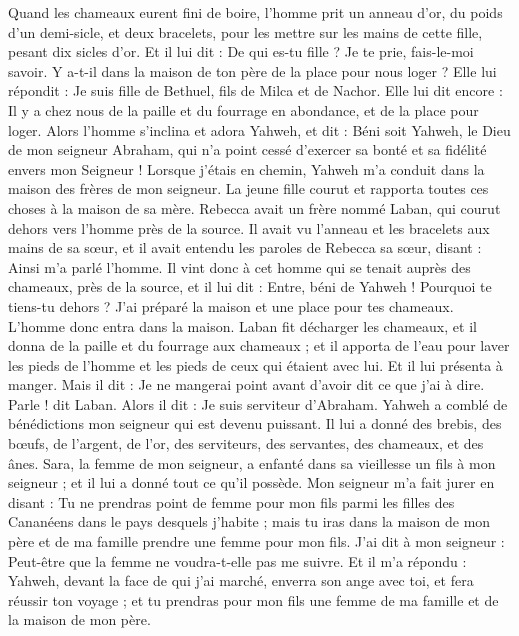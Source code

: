 \begin{multicols}{2}
Quand les chameaux eurent fini de boire, l'homme prit un anneau d'or, du poids d'un demi-sicle, et deux bracelets, pour les mettre sur les mains de cette fille, pesant dix sicles d'or.
Et il lui dit : De qui es-tu fille ? Je te prie, fais-le-moi savoir. Y a-t-il dans la maison de ton père de la place pour nous loger ?
Elle lui répondit : Je suis fille de Bethuel, fils de Milca et de Nachor.
Elle lui dit encore : Il y a chez nous de la paille et du fourrage en abondance, et de la place pour loger.
Alors l'homme s'inclina et adora Yahweh,
et dit : Béni soit Yahweh, le Dieu de mon seigneur Abraham, qui n'a point cessé d'exercer sa bonté et sa fidélité envers mon Seigneur ! Lorsque j'étais en chemin, Yahweh m'a conduit dans la maison des frères de mon seigneur.
La jeune fille courut et rapporta toutes ces choses à la maison de sa mère.
Rebecca avait un frère nommé Laban, qui courut dehors vers l'homme près de la source.
Il avait vu l'anneau et les bracelets aux mains de sa sœur, et il avait entendu les paroles de Rebecca sa sœur, disant : Ainsi m'a parlé l'homme. Il vint donc à cet homme qui se tenait auprès des chameaux, près de la source,
et il lui dit : Entre, béni de Yahweh ! Pourquoi te tiens-tu dehors ? J'ai préparé la maison et une place pour tes chameaux.
L'homme donc entra dans la maison. Laban fit décharger les chameaux, et il donna de la paille et du fourrage aux chameaux ; et il apporta de l'eau pour laver les pieds de l'homme et les pieds de ceux qui étaient avec lui.
Et il lui présenta à manger. Mais il dit : Je ne mangerai point avant d'avoir dit ce que j'ai à dire. Parle ! dit Laban.
Alors il dit : Je suis serviteur d'Abraham.
Yahweh a comblé de bénédictions mon seigneur qui est devenu puissant. Il lui a donné des brebis, des bœufs, de l'argent, de l'or, des serviteurs, des servantes, des chameaux, et des ânes.
Sara, la femme de mon seigneur, a enfanté dans sa vieillesse un fils à mon seigneur ; et il lui a donné tout ce qu'il possède.
Mon seigneur m'a fait jurer en disant : Tu ne prendras point de femme pour mon fils parmi les filles des Cananéens dans le pays desquels j'habite ;
mais tu iras dans la maison de mon père et de ma famille prendre une femme pour mon fils.
J'ai dit à mon seigneur : Peut-être que la femme ne voudra-t-elle pas me suivre.
Et il m'a répondu : Yahweh, devant la face de qui j'ai marché, enverra son ange avec toi, et fera réussir ton voyage ; et tu prendras pour mon fils une femme de ma famille et de la maison de mon père.

\end{multicols}

